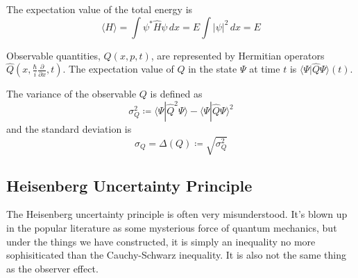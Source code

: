 \documentclass{article}
\newcommand{\braket}[2]{\langle #1 | #2 \rangle}
\begin{document}
    \begin{example}
      The expectation value of the total energy is 
      \begin{equation} 
        \langle H \rangle = \int \psi^\ast \hat{H} \psi \,dx = E \int |\psi|^2 \,dx = E
      \end{equation}      
    \end{example}

    \begin{theorem} 
      Observable quantities, $Q(x, p, t)$, are represented by Hermitian operators $\hat{Q}(x, \frac{\hbar}{i} \frac{\partial}{\partial x}, t)$. The expectation value of $Q$ in the state $\Psi$ at time $t$ is $\braket{\Psi}{\hat{Q} \Psi} (t)$. 
    \end{theorem}

    \begin{definition}[Variance]
      The variance of the observable $Q$ is defined as 
      \begin{equation} 
        \sigma_Q^2 \coloneqq \braket{\Psi}{\hat{Q}^2 \Psi} - \braket{\Psi}{\hat{Q} \Psi}^2
      \end{equation}
      and the standard deviation is 
      \begin{equation} 
        \sigma_Q = \Delta(Q) \coloneqq \sqrt{\sigma_Q^2}
      \end{equation}
    \end{definition}

  \subsection{Heisenberg Uncertainty Principle} 

    The Heisenberg uncertainty principle is often very misunderstood. It's blown up in the popular literature as some mysterious force of quantum mechanics, but under the things we have constructed, it is simply an inequality no more sophisiticated than the Cauchy-Schwarz inequality. It is also not the same thing as the observer effect. 
\end{document}
